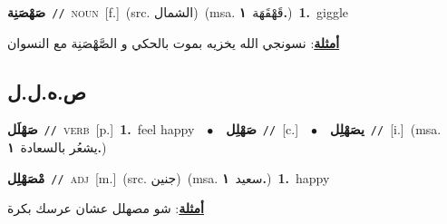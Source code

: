 \documentclass[10pt,a4paper,twoside]{article} %
\begin{document}
\begin{multicols}{2}
{\setlength\topsep{0pt}\textbf{\foreignlanguage{arabic}{صَهْصَنِة}}\ {\color{gray}\texttt{//}\color{black}}\ \textsc{noun}\ [f.]\ (src. \color{gray}\foreignlanguage{arabic}{الشمال}\color{black})\ \color{gray}(msa. \foreignlanguage{arabic}{قَهْقَهَة}~\foreignlanguage{arabic}{\textbf{١.}})\color{black}\ \textbf{1.}~giggle\  \begin{flushright}\color{gray}\foreignlanguage{arabic}{\textbf{\underline{\foreignlanguage{arabic}{أمثلة}}}: نسونجي الله يخزيه بموت بالحكي و الصَّهْصَنِة مع النسوان}\end{flushright}\color{black}} \vspace{2mm}

\vspace{-3mm}
\subsection*{\color{blue}\foreignlanguage{arabic}{ص.ه.ل.ل}\color{blue}{}} 

{\setlength\topsep{0pt}\textbf{\foreignlanguage{arabic}{صَهْلَل}}\ {\color{gray}\texttt{//}\color{black}}\ \textsc{verb}\ [p.]\ \textbf{1.}~feel happy\ \ $\bullet$\ \ \setlength\topsep{0pt}\textbf{\foreignlanguage{arabic}{صَهْلِل}}\ {\color{gray}\texttt{//}\color{black}}\ [c.]\ \ $\bullet$\ \ \setlength\topsep{0pt}\textbf{\foreignlanguage{arabic}{يصَهْلِل}}\ {\color{gray}\texttt{//}\color{black}}\ [i.]\ \color{gray}(msa. \foreignlanguage{arabic}{يشعُر بالسعادة}~\foreignlanguage{arabic}{\textbf{١.}})\color{black}\ } \vspace{2mm}

{\setlength\topsep{0pt}\textbf{\foreignlanguage{arabic}{مْصَهْلِل}}\ {\color{gray}\texttt{//}\color{black}}\ \textsc{adj}\ [m.]\ (src. \color{gray}\foreignlanguage{arabic}{جنين}\color{black})\ \color{gray}(msa. \foreignlanguage{arabic}{سعيد}~\foreignlanguage{arabic}{\textbf{١.}})\color{black}\ \textbf{1.}~happy\  \begin{flushright}\color{gray}\foreignlanguage{arabic}{\textbf{\underline{\foreignlanguage{arabic}{أمثلة}}}: شو مصهلل عشان عرسك بكرة}\end{flushright}\color{black}} \vspace{2mm}


\end{multicols}
\end{document}
